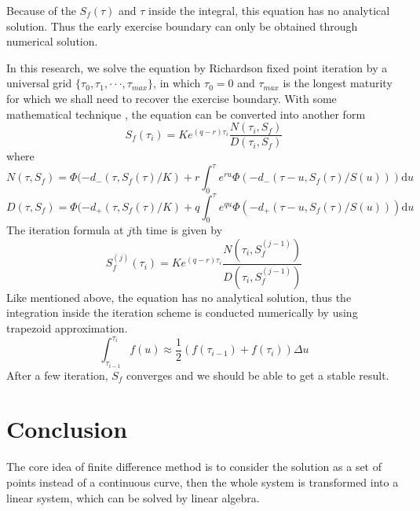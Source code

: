 \documentclass{article}
\begin{document}
Because of the $S_f(\tau)$ and $\tau$ inside the integral, this equation has no analytical solution. Thus the early exercise boundary can only be obtained through numerical solution.

In this research, we solve the equation by Richardson fixed point iteration by a universal grid $\{\tau_0,\tau_1,\cdot\cdot\cdot,\tau_{max}\}$, in which $\tau_0=0$ and $\tau_{max}$ is the longest maturity for which we shall need to recover the exercise boundary. With some mathematical technique , the equation can be converted into another form
$$S_f(\tau_i)=K e^{(q-r)\tau_{i}} \frac{N(\tau_i,S_f)}{D(\tau_i,S_f)}$$
where
$$N(\tau,S_f)=\Phi(-d_{-}(\tau,S_f(\tau)/K)+r\int_0^{\tau} e^{r u}\Phi(-d_{-}(\tau-u,S_f(\tau)/S(u)))\mathrm{d}u$$
$$D(\tau,S_f)=\Phi(-d_{+}(\tau,S_f(\tau)/K)+q\int_0^{\tau} e^{q u}\Phi(-d_{+}(\tau-u,S_f(\tau)/S(u)))\mathrm{d}u$$
The iteration formula at $j$th time is given by
$$S^{(j)}_f(\tau_i)=K e^{(q-r)\tau_{i}} \frac{N(\tau_i,S^{(j-1)}_f)}{D(\tau_i,S^{(j-1)}_f)}$$
Like mentioned above, the equation has no analytical solution, thus the integration inside the iteration scheme is conducted numerically by using trapezoid approximation.
$$\int_{\tau_{i-1}}^{\tau_{i}}f(u) \approx \frac{1}{2} (f(\tau_{i-1})+f(\tau_{i})) \Delta u$$
After a few iteration, $S_f$ converges and we should be able to get a stable result.
\section{Conclusion}
The core idea of finite difference method is to consider the solution as a set of points instead of a continuous curve, then the whole system is transformed into a linear system, which can be solved by linear algebra.
\end{document}

